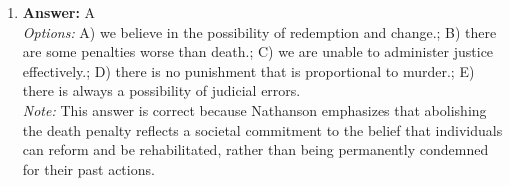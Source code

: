 \documentclass[12pt]{article}
\begin{document}
\begin{enumerate}[label=\arabic*.]
\\ \textit{Note:} Moore asserts that many past philosophers mistakenly equate "good" with natural properties or empirical facts, committing the naturalistic fallacy by trying to define ethical terms in terms of non-ethical ones.
\item \textbf{Answer:} A
\\ \textit{Options:} A) we believe in the possibility of redemption and change.; B) there are some penalties worse than death.; C) we are unable to administer justice effectively.; D) there is no punishment that is proportional to murder.; E) there is always a possibility of judicial errors.
\\ \textit{Note:} This answer is correct because Nathanson emphasizes that abolishing the death penalty reflects a societal commitment to the belief that individuals can reform and be rehabilitated, rather than being permanently condemned for their past actions.
\end{enumerate}
\end{document}

